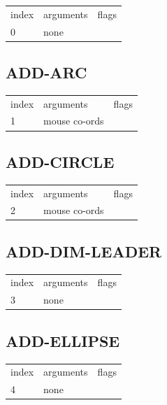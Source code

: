 \documentclass[a4paper]{report}
\begin{document}
\begin{center}
\begin{tabular}{l | l | l}
index & arguments & flags \\
0 & none & 
\end{tabular}
\end{center}

\subsection{ADD-ARC}

\begin{center}
\begin{tabular}{l | l | l}
index & arguments & flags \\
1 & mouse co-ords & 
\end{tabular}
\end{center}

\subsection{ADD-CIRCLE}

\begin{center}
\begin{tabular}{l | l | l}
index & arguments & flags \\
2 & mouse co-ords & 
\end{tabular}
\end{center}

\subsection{ADD-DIM-LEADER}

\begin{center}
\begin{tabular}{l | l | l}
index & arguments & flags \\
3 & none & 
\end{tabular}
\end{center}

\subsection{ADD-ELLIPSE}

\begin{center}
\begin{tabular}{l | l | l}
index & arguments & flags \\
4 & none & 
\end{tabular}
\end{center}
\end{document}

